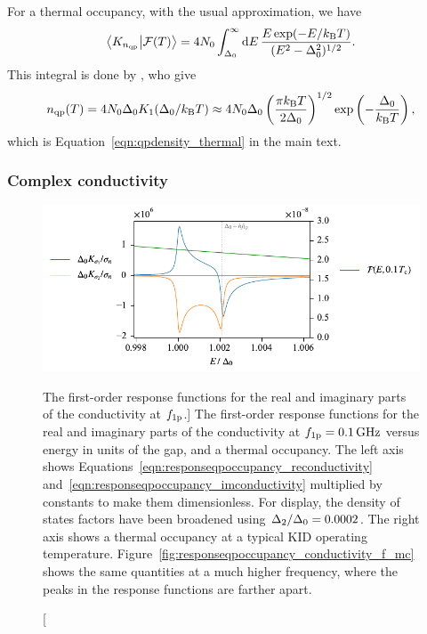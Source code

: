 For a thermal occupancy, with the usual approximation, we have
\begin{equation}
\braket{K_{n_{\mathrm{qp}}}}{\mathcal{F}(T)}
  =
  4 N_0 \int_{\Delta_0}^{\infty} \dd{E}
  \frac{E \exp(-E / k_\mathrm{B} T)}{(E^2 - \Delta_0^2)^{1/2}}.
\end{equation}
This integral is done by \textcite{Thomas2015SUST}, who give
\begin{equation}
n_{\mathrm{qp}}(T)
  =
  4 N_0 \Delta_0
  K_1(\Delta_0 / k_\mathrm{B} T)
  \approx
  4 N_0 \Delta_0
  \left( \frac{\pi k_\mathrm{B} T}{2 \Delta_0} \right)^{1/2}
  \exp \left( -\frac{\Delta_0}{k_\mathrm{B} T} \right),
\label{eqn:first-order_response.qpdensity_thermal}
\end{equation}
which is Equation~\ref{eqn:qpdensity_thermal} in the main text.

\subsubsection{Complex conductivity}

\begin{figure}[htb]
\centering
\includegraphics[width=\textwidth]{first-order_response/responseqpoccupancy_conductivity_f_1p.pdf}
\caption
[The first-order response functions for the real and imaginary parts of the conductivity at $f_{\mathrm{1p}}$.]
{The first-order response functions for the real and imaginary parts of the conductivity at $f_{\mathrm{1p}} = \SI{0.1}{GHz}$ versus energy in units of the gap, and a thermal occupancy.
The left axis shows Equations~\ref{eqn:responseqpoccupancy_reconductivity} and~\ref{eqn:responseqpoccupancy_imconductivity} multiplied by constants to make them dimensionless.
For display, the density of states factors have been broadened using $\Delta_2 / \Delta_0 = 0.0002$.
The right axis shows a thermal occupancy at a typical KID operating temperature.
Figure~\ref{fig:responseqpoccupancy_conductivity_f_mc} shows the same quantities at a much higher frequency, where the peaks in the response functions are farther apart.}
\label{fig:responseqpoccupancy_conductivity_f_1p}
\end{figure}

